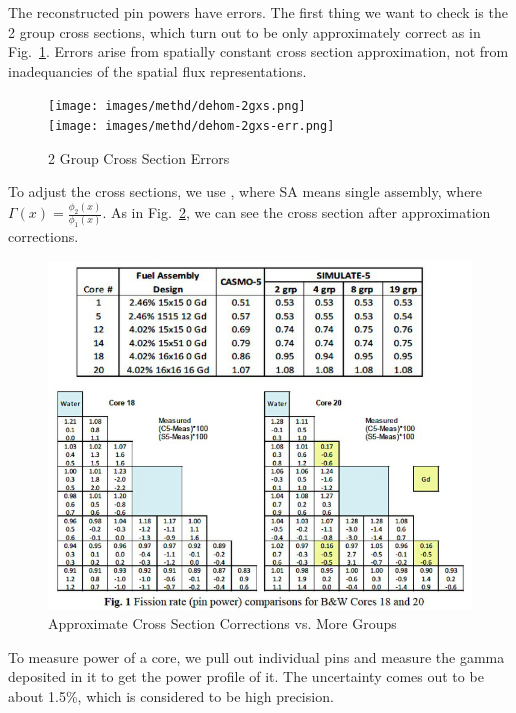 \documentclass{school-22.211-notes}
\begin{document}
\clearpage
{}
The reconstructed pin powers have errors. The first thing we want to check is the 2 group cross sections, which turn out to be only approximately correct as in Fig.~\ref{dehom-2g-err}. Errors arise from spatially constant cross section approximation, not from inadequancies of the spatial flux representations. 
\begin{figure}[ht]
  \centering
  \texttt{[image: images/methd/dehom-2gxs.png]}
  \\
  \texttt{[image: images/methd/dehom-2gxs-err.png]}
  \caption{2 Group Cross Section Errors} \label{dehom-2g-err}
\end{figure}
To adjust the cross sections, we use , where SA means single assembly, 
where $\Gamma(x) = \frac{\phi_2(x)}{\phi_1(x)}$. As in Fig.~\ref{approx-xs}, we can see the cross section after approximation corrections. 
\begin{figure}[ht]
  \centering
  \includegraphics[width=5in]{images/methd/approx-xs.png}
  \caption{Approximate Cross Section Corrections vs. More Groups} \label{approx-xs}
\end{figure}
To measure power of a core, we pull out individual pins and measure the gamma deposited in it to get the power profile of it. The uncertainty comes out to be about 1.5\%, which is considered to be high precision. 
\end{document}

